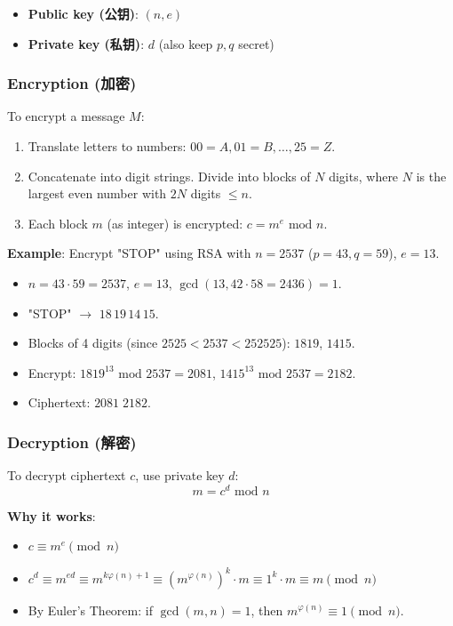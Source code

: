 \documentclass[10pt,a4paper,openany]{ctexbook}
\theoremstyle{definition}
\theoremstyle{remark}
\begin{document}
\begin{itemize}
\item \textbf{Public key (公钥)}: $(n, e)$
\item \textbf{Private key (私钥)}: $d$ (also keep $p, q$ secret)

\end{itemize}

\subsubsection{Encryption (加密)}

To encrypt a message $M$:
\begin{enumerate}
\item Translate letters to numbers: $00 = A, 01 = B, \dots, 25 = Z$.
\item Concatenate into digit strings. Divide into blocks of $N$ digits, where $N$ is the largest even number with $2N$ digits $\leq n$.
\item Each block $m$ (as integer) is encrypted: $c = m^e \text{ mod } n$.

\end{enumerate}

\textbf{Example}: Encrypt "STOP" using RSA with $n = 2537$ ($p=43, q=59$), $e = 13$.
\begin{itemize}
\item $n = 43 \cdot 59 = 2537$, $e = 13$, $\gcd(13, 42 \cdot 58 = 2436) = 1$.
\item "STOP" $\rightarrow$ $18\,19\,14\,15$.
\item Blocks of 4 digits (since $2525 < 2537 < 252525$): $1819$, $1415$.
\item Encrypt: $1819^{13} \text{ mod } 2537 = 2081$, $1415^{13} \text{ mod } 2537 = 2182$.
\item Ciphertext: $2081\;2182$.

\end{itemize}

\subsubsection{Decryption (解密)}

To decrypt ciphertext $c$, use private key $d$:
\[
m = c^d \text{ mod } n
\]

\textbf{Why it works}:
\begin{itemize}
\item $c \equiv m^e \pmod{n}$
\item $c^d \equiv m^{ed} \equiv m^{k\varphi(n) + 1} \equiv (m^{\varphi(n)})^k \cdot m \equiv 1^k \cdot m \equiv m \pmod{n}$
\item By Euler's Theorem: if $\gcd(m, n) = 1$, then $m^{\varphi(n)} \equiv 1 \pmod{n}$.

\end{itemize}
\end{document}
